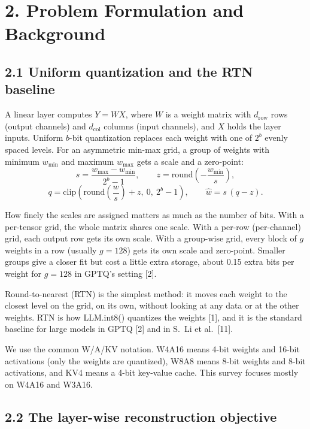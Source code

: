 \documentclass[10pt,twocolumn]{article}
\begin{document}
\section{2. Problem Formulation and Background}

\subsection{2.1 Uniform quantization and the RTN baseline}

A linear layer computes $Y = WX$, where $W$ is a weight matrix with
$d_{\mathrm{row}}$ rows (output channels) and $d_{\mathrm{col}}$ columns
(input channels), and $X$ holds the layer inputs. Uniform $b$-bit
quantization replaces each weight with one of $2^b$ evenly spaced
levels. For an asymmetric min-max grid, a group of weights with minimum
$w_{\min}$ and maximum $w_{\max}$ gets a scale and a zero-point:
\[
s = \frac{w_{\max} - w_{\min}}{2^b - 1}, \qquad
z = \mathrm{round}\!\left(-\frac{w_{\min}}{s}\right),
\]
\[
q = \mathrm{clip}\!\left(\mathrm{round}\!\left(\frac{w}{s}\right) + z,\
0,\ 2^b - 1\right), \qquad \hat{w} = s\,(q - z).
\]

How finely the scales are assigned matters as much as the number of
bits. With a per-tensor grid, the whole matrix shares one scale. With a
per-row (per-channel) grid, each output row gets its own scale. With a
group-wise grid, every block of $g$ weights in a row (usually $g = 128$)
gets its own scale and zero-point. Smaller groups give a closer fit but
cost a little extra storage, about 0.15 extra bits per weight for
$g = 128$ in GPTQ's setting [2].

Round-to-nearest (RTN) is the simplest method: it moves each weight to
the closest level on the grid, on its own, without looking at any data
or at the other weights. RTN is how LLM.int8() quantizes the weights
[1], and it is the standard baseline for large models in GPTQ [2] and in
S.~Li et al.~[11].

We use the common W/A/KV notation. W4A16 means 4-bit weights and 16-bit
activations (only the weights are quantized), W8A8 means 8-bit weights
and 8-bit activations, and KV4 means a 4-bit key-value cache. This
survey focuses mostly on W4A16 and W3A16.

\subsection{2.2 The layer-wise reconstruction objective}
\end{document}
